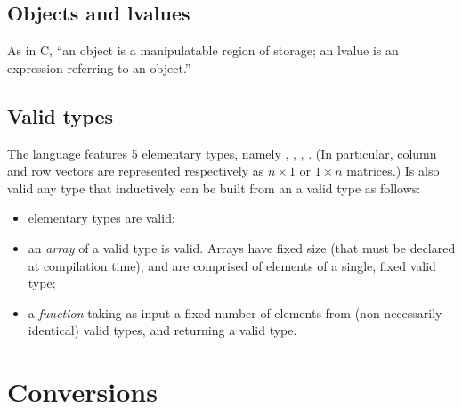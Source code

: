 \subsection{Objects and lvalues}
As in C, ``an object is a manipulatable region of storage; an lvalue is an expression referring to an object.''

\subsection{Valid types}

The language features 5 elementary types, namely \integ, \float, \complex, \mat. (In particular, column and row vectors are represented respectively as $n\times1$ or $1\times n$ matrices.) Is also valid any type that inductively can be built from an a valid type as follows:
\begin{itemize}
  \item elementary types are valid;
  \item an \emph{array} of a valid type is valid. Arrays have fixed size (that must be declared at compilation time), and are comprised of elements of a single, fixed valid type;
  \item a \emph{function} taking as input a fixed number of elements from (non-necessarily identical) valid types, and returning a valid type.
\end{itemize}

\section{Conversions}

